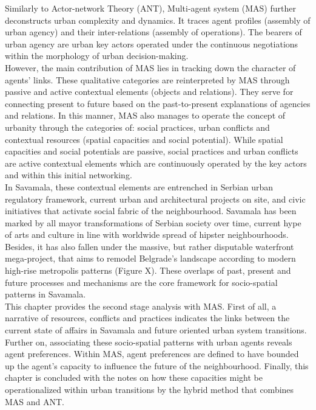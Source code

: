 \documentclass[11pt]{report}
\begin{document}
Similarly to Actor-network Theory (ANT), Multi-agent system (MAS) further deconstructs urban complexity and dynamics.
It traces agent profiles (assembly of urban agency) and their inter-relations (assembly of operations).
The bearers of urban agency are urban key actors operated under the continuous negotiations within the morphology of urban decision-making.
\\

However, the main contribution of MAS lies in tracking down the character of agents' links. These qualitative categories are reinterpreted by MAS through passive and active contextual elements (objects and relations). They serve for connecting present to future based on the past-to-present explanations of agencies and relations.
In this manner, MAS also manages to operate the concept of urbanity through the categories of: social practices, urban conflicts and contextual resources (spatial capacities and social potential). While spatial capacities and social potentials are passive, social practices and urban conflicts are active contextual elements which are continuously operated by the key actors and within this initial networking.
\\

In Savamala, these contextual elements are entrenched in Serbian urban regulatory framework, current urban and architectural projects on site, and civic initiatives that activate social fabric of the neighbourhood.
Savamala has been marked by all mayor transformations of Serbian society over time, current hype of arts and culture in line with worldwide spread of hipster neighbourhoods.
Besides, it has also fallen under the massive, but rather disputable waterfront mega-project, that aims to remodel Belgrade's landscape according to modern high-rise metropolis patterns (Figure X). %
These overlaps of past, present and future processes and mechanisms are the core framework for socio-spatial patterns in Savamala.
\\

This chapter provides the second stage analysis with MAS. 
First of all, a narrative of resources, conflicts and practices indicates the links between the current state of affairs in Savamala and future oriented urban system transitions. 
Further on, associating these socio-spatial patterns with urban agents reveals agent preferences.
Within MAS, agent preferences are defined to have bounded up the agent's capacity to influence the future of the neighbourhood.
Finally, this chapter is concluded with the notes on how these capacities might be operationalized within urban transitions by the hybrid method that combines MAS and ANT.
\end{document}
